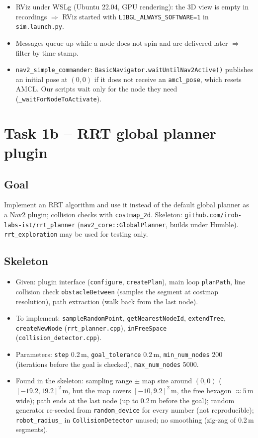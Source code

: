 \documentclass[10pt]{article}
\newcommand{\pkg}[1]{\texttt{#1}}
\begin{document}
\begin{itemize}
  \item RViz under WSLg (Ubuntu 22.04, GPU rendering): the 3D view is empty in recordings $\Rightarrow$ RViz started
        with \pkg{LIBGL\_ALWAYS\_SOFTWARE=1} in \pkg{sim.launch.py}.
  \item Messages queue up while a node does not spin and are delivered later $\Rightarrow$ filter by time stamp.
  \item \pkg{nav2\_simple\_commander}: \pkg{BasicNavigator.waitUntilNav2Active()} publishes an initial pose at
        $(0,0)$ if it does not receive an \pkg{amcl\_pose}, which resets AMCL. Our scripts wait only for the
        node they need (\pkg{\_waitForNodeToActivate}).
\end{itemize}

\section{Task 1b -- RRT global planner plugin}

\subsection{Goal}
Implement an RRT algorithm and use it instead of the default global planner as a Nav2 plugin; collision checks with
\pkg{costmap\_2d}. Skeleton: \pkg{github.com/irob-labs-ist/rrt\_planner} (\pkg{nav2\_core::GlobalPlanner},
builds under Humble). \pkg{rrt\_exploration} may be used for testing only.

\subsection{Skeleton}
\begin{itemize}
  \item Given: plugin interface (\pkg{configure}, \pkg{createPlan}), main loop \pkg{planPath}, line collision check
        \pkg{obstacleBetween} (samples the segment at costmap resolution), path extraction (walk back from the last node).
  \item To implement: \pkg{sampleRandomPoint}, \pkg{getNearestNodeId}, \pkg{extendTree}, \pkg{createNewNode}
        (\pkg{rrt\_planner.cpp}), \pkg{inFreeSpace} (\pkg{collision\_detector.cpp}).
  \item Parameters: \pkg{step} 0.2\,m, \pkg{goal\_tolerance} 0.2\,m, \pkg{min\_num\_nodes} 200 (iterations before the goal
        is checked), \pkg{max\_num\_nodes} 5000.
  \item Found in the skeleton: sampling range $\pm$ map size around $(0,0)$ ($[-19.2, 19.2]^2$\,m, but the map covers
        $[-10, 9.2]^2$\,m, the free hexagon $\approx 5$\,m wide); path ends at the last node (up to 0.2\,m before the goal);
        random generator re-seeded from \pkg{random\_device} for every number (not reproducible); \pkg{robot\_radius\_} in
        \pkg{CollisionDetector} unused; no smoothing (zig-zag of 0.2\,m segments).
\end{itemize}
\end{document}
